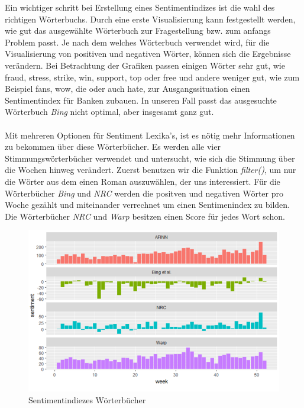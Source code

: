 Ein wichtiger schritt bei Erstellung eines Sentimentindizes ist die wahl des richtigen Wörterbuchs. Durch eine erste Visualisierung kann festgestellt werden, wie gut das ausgewählte Wörterbuch zur Fragestellung bzw. zum anfangs Problem passt.  Je nach dem welches Wörterbuch verwendet wird, für die Visualisierung von positiven und negativen Wörter, können sich die Ergebnisse verändern. Bei Betrachtung der Grafiken passen einigen Wörter sehr gut, wie fraud, stress, strike, win, support, top oder free und andere weniger gut, wie zum Beispiel fans, wow, die oder auch hate, zur Ausgangssituation einen Sentimentindex für Banken zubauen. In unseren Fall passt das ausgesuchte  Wörterbuch \textit{Bing} nicht optimal, aber insgesamt ganz gut.\\
\\
Mit mehreren Optionen für Sentiment Lexika's, ist es nötig mehr Informationen zu bekommen über diese Wörterbücher. Es werden alle vier Stimmungswörterbücher verwendet und untersucht, wie sich die Stimmung über die Wochen hinweg verändert. Zuerst benutzen wir die Funktion \textit{filter()}, um nur die Wörter aus dem einen Roman auszuwählen, der uns interessiert. Für die Wörterbücher \textit{Bing} und \textit{NRC} werden die positven und negativen Wörter pro Woche gezählt und miteinander verrechnet um einen Sentimenindex zu bilden. Die Wörterbücher \textit{NRC} und \textit{Warp} besitzen einen Score für jedes Wort schon.
\begin{figure}[H]
	\centering
	\includegraphics[width=1\textwidth]{Woertbuch.png}
	\caption{Sentimentindiezes Wörterbücher}
	\label{senti}
\end{figure}
